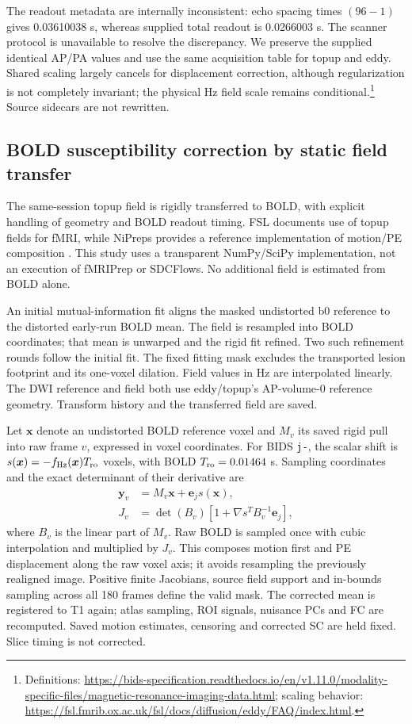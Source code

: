 \documentclass[11pt,a4paper]{article}
\begin{document}
The readout metadata are internally inconsistent: echo spacing times $(96-1)$ gives 0.03610038 s, whereas supplied total readout is 0.0266003 s. The scanner protocol is unavailable to resolve the discrepancy. We preserve the supplied identical AP/PA values and use the same acquisition table for topup and eddy. Shared scaling largely cancels for displacement correction, although regularization is not completely invariant; the physical Hz field scale remains conditional.\footnote{Definitions: \url{https://bids-specification.readthedocs.io/en/v1.11.0/modality-specific-files/magnetic-resonance-imaging-data.html}; scaling behavior: \url{https://fsl.fmrib.ox.ac.uk/fsl/docs/diffusion/eddy/FAQ/index.html}.} Source sidecars are not rewritten.

\subsection{BOLD susceptibility correction by static field transfer}
The same-session topup field is rigidly transferred to BOLD, with explicit handling of geometry and BOLD readout timing. FSL documents use of topup fields for fMRI, while NiPreps provides a reference implementation of motion/PE composition \citep{fslbold,sdcflows}. This study uses a transparent NumPy/SciPy implementation, not an execution of fMRIPrep or SDCFlows. No additional field is estimated from BOLD alone.

An initial mutual-information fit aligns the masked undistorted b0 reference to the distorted early-run BOLD mean. The field is resampled into BOLD coordinates; that mean is unwarped and the rigid fit refined. Two such refinement rounds follow the initial fit. The fixed fitting mask excludes the transported lesion footprint and its one-voxel dilation. Field values in Hz are interpolated linearly. The DWI reference and field both use eddy/topup's AP-volume-0 reference geometry. Transform history and the transferred field are saved.

Let $\boldsymbol x$ denote an undistorted BOLD reference voxel and $M_v$ its saved rigid pull into raw frame $v$, expressed in voxel coordinates. For BIDS \texttt{j-}, the scalar shift is $s(\boldsymbol x)=-f_{\rm Hz}(\boldsymbol x)T_{\rm ro}$ voxels, with BOLD $T_{\rm ro}=0.01464$ s. Sampling coordinates and the exact determinant of their derivative are
\begin{align}
 \boldsymbol y_v&=M_v\boldsymbol x+\boldsymbol e_j s(\boldsymbol x),\\
 J_v&=\det(B_v)\left[1+\nabla s^T B_v^{-1}\boldsymbol e_j\right],
\end{align}
where $B_v$ is the linear part of $M_v$. Raw BOLD is sampled once with cubic interpolation and multiplied by $J_v$. This composes motion first and PE displacement along the raw voxel axis; it avoids resampling the previously realigned image. Positive finite Jacobians, source field support and in-bounds sampling across all 180 frames define the valid mask. The corrected mean is registered to T1 again; atlas sampling, ROI signals, nuisance PCs and FC are recomputed. Saved motion estimates, censoring and corrected SC are held fixed. Slice timing is not corrected.
\end{document}

